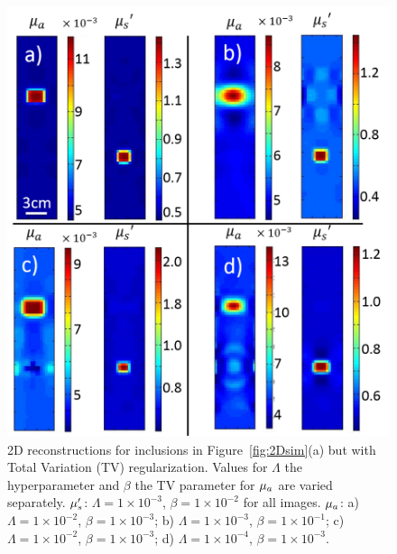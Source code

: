 \begin{figure}[h]
\begin{center}
\includegraphics[width=12cm]{./figures/4_Gen3/2Dtvreg.png}
\caption[2D reconstructions for inclusions in Figure~\ref{fig:2Dsim}(a) with Total Variation (TV) regularization]{2D reconstructions for inclusions in Figure~\ref{fig:2Dsim}(a) but with Total Variation (TV) regularization. Values for $\Lambda$ the hyperparameter and $\beta$ the TV parameter for $\mu_a$ are varied separately. $\mu_s^{\prime}$: $\Lambda=1\times10^{-3}$, $\beta=1\times10^{-2}$ for all images. $\mu_a$: a)  $\Lambda=1\times10^{-2}$, $\beta=1\times10^{-3}$; b) $\Lambda=1\times10^{-3}$, $\beta=1\times10^{-1}$; c) $\Lambda=1\times10^{-2}$, $\beta=1\times10^{-3}$; d) $\Lambda=1\times10^{-4}$, $\beta=1\times10^{-3}$.}
\label{fig:2Dtvreg}
\end{center}
\end{figure}

